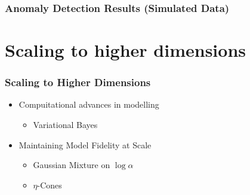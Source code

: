 \documentclass[aspectratio=169]{beamer}
\begin{document}
\begin{frame}
  \frametitle{Anomaly Detection Results (Simulated Data)}
  \begin{center}
    
  \end{center}
\end{frame}

\section[Scaling]{Scaling to higher dimensions}

\begin{frame}
  \frametitle{Scaling to Higher Dimensions}
  \begin{itemize}
    \item Compuitational advances in modelling
      \begin{itemize}
        \item Variational Bayes
      \end{itemize}
    \item Maintaining Model Fidelity at Scale
      \begin{itemize}
        \item Gaussian Mixture on $\log\alpha$
        \item $\eta$-Cones
      \end{itemize}
  \end{itemize}
\end{frame}
\end{document}

